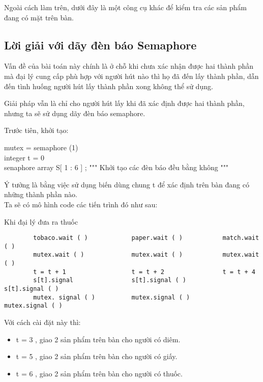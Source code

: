 \documentclass[a4paper]{article}
\begin{document}
	Ngoài cách làm trên, dưới đây là một công cụ khác để kiểm tra các sản phẩm đang có mặt trên bàn.

	\subsection{Lời giải với dãy đèn báo Semaphore \cite{r3}}	
	Vấn đề của bài toán này chính là ở chỗ khi chưa xác nhận được hai thành phần mà đại lý cung cấp phù hợp với 
	người hút nào thì họ đã đến lấy thành phần, dẫn đến tình huống người hút lấy thành phần xong không thể sử dụng.
	
	Giải pháp vẫn là chỉ cho người hút lấy khi đã xác định được hai thành phần, nhưng ta sẽ sử dụng dãy đèn báo 
	semaphore.

	Trước tiên, khởi tạo:
	
	\begin{center}
		\begin{tcolorbox}
		mutex = semaphore (1) \\
		integer t = 0 \\ 
		senaphore array S[ 1 : 6 ] ; """ Khởi tạo các đèn báo đều bằng không """
		\end{tcolorbox}
	\end{center}
	
	Ý tưởng là bằng việc sử dụng biến dùng chung t để xác định trên bàn đang có những thành phần nào. \\
	Ta sẽ có mô hình code các tiến trình đó như sau: 
	\begin{center}
		Khi đại lý đưa ra thuốc
		\begin{tcolorbox}
		\begin{verbatim}
		tobaco.wait ( )            paper.wait ( )           match.wait ( )
		mutex.wait ( )             mutex.wait ( )           mutex.wait ( )
		t = t + 1                  t = t + 2                t = t + 4
		s[t].signal                s[t].signal ( )          s[t].signal ( )
		mutex. signal ( )          mutex.signal ( )         mutex.signal ( )
		\end{verbatim}
		\end{tcolorbox}
	\end{center}

	Với cách cài đặt này thì:

	\begin{itemize}
		\item t = 3 , giao 2 sản phẩm trên bàn cho người có diêm.
		\item t = 5 , giao 2 sản phẩm trên bàn cho người có giấy.
		\item t = 6 , giao 2 sản phẩm trên bàn cho người có thuốc.
	\end{itemize}
\end{document}

